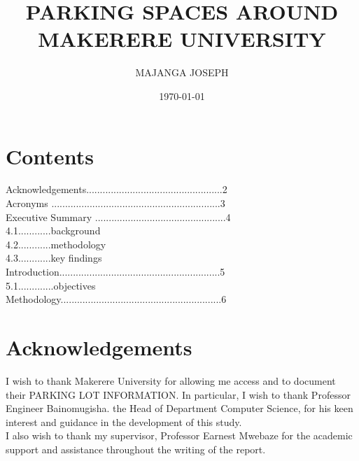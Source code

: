 \documentclass[18pt, a4paper]{article}
\begin{document}
		
				
		\title{\textbf{ PARKING SPACES AROUND MAKERERE UNIVERSITY}\\ }

		
		\author{MAJANGA JOSEPH}

		\date {\today}

		\maketitle

			
                         \section{Contents}
                  Acknowledgements..................................................2\\
                  Acronyms ..............................................................3\\
                  Executive Summary ................................................4\\
                           4.1............background\\
                           4.2............methodology\\
                           4.3............key findings\\
                  Introduction...........................................................5\\
                           5.1.............objectives\\
                  Methodology...........................................................6\\

                     \section{Acknowledgements}
I wish to thank Makerere University for allowing me access and to document their PARKING LOT INFORMATION.  In particular, I wish to thank Professor Engineer Bainomugisha.  the Head of Department Computer Science, for his keen interest and guidance in the development of this study.\\


I also wish to thank my supervisor, Professor Earnest Mwebaze for the academic support and assistance throughout the writing of the report.\\
\end{document}
